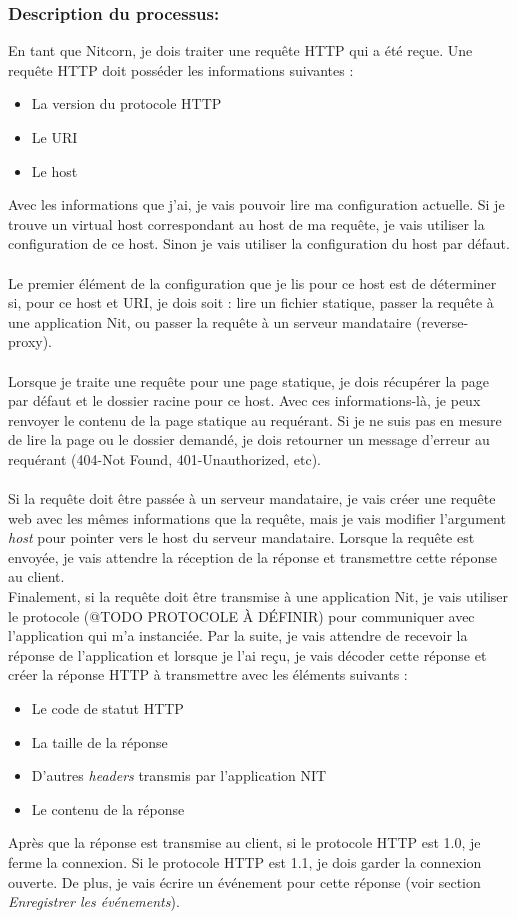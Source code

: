\documentclass{scrreprt}
\begin{document}
\begin{itemizen}
\subsubsection{Description du processus:}En tant que Nitcorn, je dois traiter une requête HTTP qui a été reçue. Une requête HTTP doit posséder les informations suivantes :
\begin{itemize}
    \item La version du protocole HTTP
    \item Le URI
    \item Le host
\end{itemize}
Avec les informations que j'ai, je vais pouvoir lire ma configuration actuelle. Si
je trouve un virtual host correspondant au host de ma requête, je vais utiliser la configuration de ce host. Sinon je vais utiliser la configuration du host par défaut. \\
\\
Le premier élément de la configuration que je lis pour ce host est de déterminer
si, pour ce host et URI, je dois soit : lire un fichier statique, passer la requête
à une application Nit, ou passer la requête à un serveur mandataire (reverse-proxy).\\
\\
Lorsque je traite une requête pour une page statique, je dois récupérer la page par
défaut et le dossier racine pour ce host. Avec ces informations-là, je peux renvoyer
le contenu de la page statique au requérant. Si je ne suis pas en mesure de lire
la page ou le dossier demandé, je dois retourner un message d'erreur au requérant
(404-Not Found, 401-Unauthorized, etc).\\
\\
Si la requête doit être passée à un serveur mandataire, je vais créer
une requête web avec les mêmes informations que la requête, mais je vais modifier
l'argument \textit{host} pour pointer vers le host du serveur mandataire. Lorsque
la requête est envoyée, je vais attendre la réception de la réponse et transmettre
cette réponse au client.
\\
Finalement, si la requête doit être transmise à une application Nit, je vais utiliser
le protocole (@TODO PROTOCOLE À DÉFINIR) pour communiquer avec l'application
qui m'a instanciée. Par la suite, je vais attendre de recevoir la réponse de l'application
et lorsque je l'ai reçu, je vais décoder cette réponse et créer la réponse HTTP
à transmettre avec les éléments suivants :
\begin{itemize}
    \item Le code de statut HTTP
    \item La taille de la réponse
    \item D'autres \textit{headers} transmis par l'application NIT
    \item Le contenu de la réponse
\end{itemize}
Après que la réponse est transmise au client, si le protocole HTTP est 1.0, je ferme
la connexion. Si le protocole HTTP est 1.1, je dois garder la connexion
ouverte. De plus, je vais écrire un événement pour cette réponse (voir section
\textit{Enregistrer les événements}).


\end{itemizen}
\end{document}
